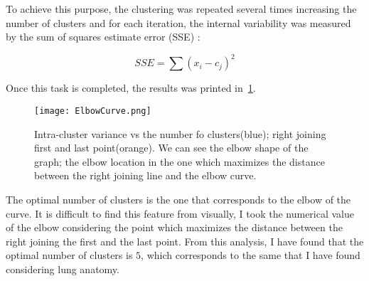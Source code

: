\documentclass{standalone}
\begin{document}
	To achieve this purpose, the clustering was repeated several times increasing the number of clusters and for each iteration, the internal variability was measured by the sum of squares estimate error (SSE) : 

	\begin{equation}\label{eq:SumOfSquare}
		SSE = \sum (x_i - c_j)^2
	\end{equation}
	
	Once this task is completed, the results was printed in \figurename\,\ref{fig:ElbowCurve}. 
	
	\begin{figure}[h!]
		\centering
		\texttt{[image: ElbowCurve.png]}
		\caption{Intra-cluster variance vs the number fo clusters(blue); right joining first and last point(orange). We can see the elbow shape of the graph; the elbow location in the one which maximizes the distance between the right joining line and the elbow curve.}\label{fig:ElbowCurve}
	\end{figure}

	The optimal number of clusters is the one that corresponds to the elbow of the curve. It is difficult to find this feature from visually, I took the numerical value of the elbow considering the point which maximizes the distance between the right joining the first and the last point.
	From this analysis, I have found that the optimal number of clusters is $5$, which corresponds to the same that I have found considering lung anatomy.
\end{document}
